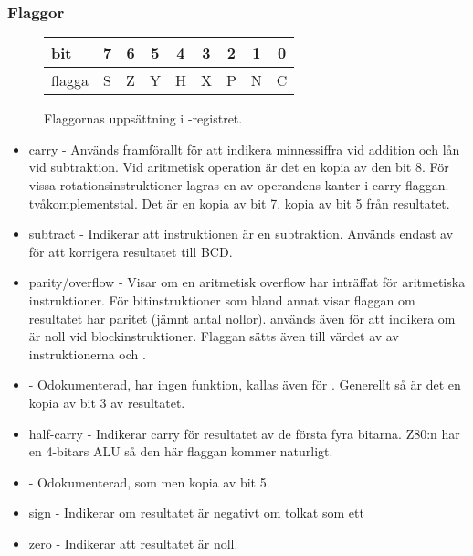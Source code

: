 \documentclass[main.tex]{subfiles}
\begin{document}
\subsubsection{Flaggor}
\begin{figure}[H]
    \center
    \begin{tabular}{|l|c|c|c|c|c|c|c|c|}
        \hline
        bit     & 7 & 6 & 5 & 4 & 3 & 2 & 1 & 0 \\ \hline
        flagga  & S & Z & Y & H & X & P & N & C \\ \hline
    \end{tabular}
    \caption{Flaggornas uppsättning i -registret.}
\end{figure}
\begin{itemize}
    \item {} carry - Används framförallt för att indikera minnessiffra
        vid addition och lån vid subtraktion. Vid aritmetisk operation är det
        en kopia av den bit 8. För vissa rotationsinstruktioner lagras en av
        operandens kanter i carry-flaggan.
        tvåkomplementstal. Det är en kopia av bit 7.
        kopia av bit 5 från resultatet.
    \item {} subtract - Indikerar att instruktionen är en subtraktion.
        Används endast av  för att korrigera resultatet till BCD.
    \item {} parity/overflow - Visar  om en aritmetisk overflow
        har inträffat för aritmetiska instruktioner. För bitinstruktioner som
        bland annat  visar flaggan om resultatet har paritet (jämnt
        antal nollor).  används även för att indikera om  är
        noll vid blockinstruktioner. Flaggan sätts även till värdet av
         av instruktionerna  och .
    \item {} - Odokumenterad, har ingen funktion, kallas även för
        . Generellt så är det en kopia av bit 3 av resultatet.
    \item {} half-carry - Indikerar carry för resultatet av de första
        fyra bitarna. Z80:n har en 4-bitars ALU så den här flaggan kommer
        naturligt.
    \item {} - Odokumenterad, som  men kopia av bit 5.
    \item {} sign - Indikerar om resultatet är negativt om tolkat som ett
    \item {} zero - Indikerar att resultatet är noll.
\end{itemize}
\end{document}
